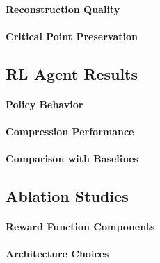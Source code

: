 \paragraph{Reconstruction Quality}

\paragraph{Critical Point Preservation}

\subsection{RL Agent Results}


\paragraph{Policy Behavior}

\paragraph{Compression Performance}

\paragraph{Comparison with Baselines}

\subsection{Ablation Studies}


\paragraph{Reward Function Components}

\paragraph{Architecture Choices}
